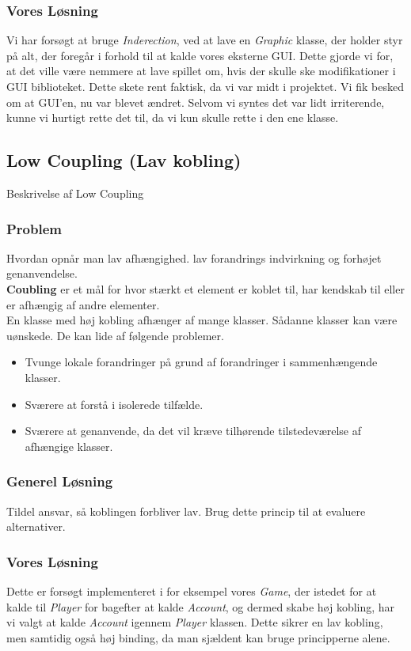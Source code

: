 \subsubsection*{Vores Løsning}
Vi har forsøgt at bruge \textit{Inderection}, ved at lave en \textit{Graphic} klasse, der holder styr på alt, der foregår i forhold til at kalde vores eksterne GUI. Dette gjorde vi for, at det ville være nemmere at lave spillet om, hvis der skulle ske modifikationer i GUI biblioteket. Dette skete rent faktisk, da vi var midt i projektet. Vi fik besked om at GUI'en, nu var blevet ændret. Selvom vi syntes det var lidt irriterende, kunne vi hurtigt rette det til, da vi kun skulle rette i den ene klasse.
\subsection{Low Coupling (Lav kobling)}
Beskrivelse af Low Coupling
\subsubsection*{Problem}
Hvordan opnår man lav afhængighed. lav forandrings indvirkning og forhøjet genanvendelse.
\\
\textbf{Coubling} er et mål for hvor stærkt et element er koblet til, har kendskab til eller er afhængig af andre elementer.
\\
En klasse med høj kobling afhænger af mange klasser. Sådanne klasser kan være uønskede. De kan lide af følgende problemer.
\begin{itemize}
\item Tvunge lokale forandringer på grund af forandringer i sammenhængende klasser.
\item Sværere at forstå i isolerede tilfælde.
\item Sværere at genanvende, da det vil kræve tilhørende tilstedeværelse af afhængige klasser.
\end{itemize}
\subsubsection*{Generel Løsning}
Tildel ansvar, så koblingen forbliver lav. Brug dette princip til at evaluere alternativer.
\subsubsection*{Vores Løsning}
Dette er forsøgt implementeret i for eksempel vores \textit{Game}, der istedet for at kalde til  \textit{Player} for bagefter at kalde \textit{Account}, og dermed skabe høj kobling, har vi valgt at kalde \textit{Account} igennem \textit{Player} klassen. Dette sikrer en lav kobling, men samtidig også høj binding, da man sjældent kan bruge principperne alene.
